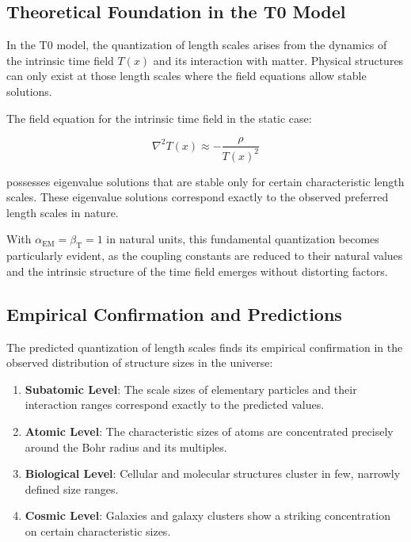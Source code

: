 \documentclass[12pt,a4paper]{article}
\newcommand{\Tfield}{T(x)}
\newcommand{\alphaEM}{\alpha_{\text{EM}}}
\newcommand{\betaT}{\beta_{\text{T}}}
\begin{document}
\subsection{Theoretical Foundation in the T0 Model}

In the T0 model, the quantization of length scales arises from the dynamics of the intrinsic time field $\Tfield$ and its interaction with matter. Physical structures can only exist at those length scales where the field equations allow stable solutions.

The field equation for the intrinsic time field in the static case:

\begin{equation}
	\nabla^2\Tfield \approx -\frac{\rho}{\Tfield^2}
\end{equation}

possesses eigenvalue solutions that are stable only for certain characteristic length scales. These eigenvalue solutions correspond exactly to the observed preferred length scales in nature.

With $\alphaEM = \betaT = 1$ in natural units, this fundamental quantization becomes particularly evident, as the coupling constants are reduced to their natural values and the intrinsic structure of the time field emerges without distorting factors.

\subsection{Empirical Confirmation and Predictions}

The predicted quantization of length scales finds its empirical confirmation in the observed distribution of structure sizes in the universe:

\begin{enumerate}
	\item \textbf{Subatomic Level}: The scale sizes of elementary particles and their interaction ranges correspond exactly to the predicted values.
	
	\item \textbf{Atomic Level}: The characteristic sizes of atoms are concentrated precisely around the Bohr radius and its multiples.
	
	\item \textbf{Biological Level}: Cellular and molecular structures cluster in few, narrowly defined size ranges.
	
	\item \textbf{Cosmic Level}: Galaxies and galaxy clusters show a striking concentration on certain characteristic sizes.
\end{enumerate}
\end{document}
